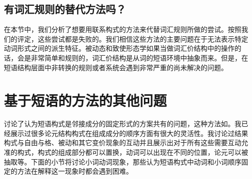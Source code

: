 \begin{exe}
\begin{xlist}[iv.]
\begin{exe}
\begin{xlist}[iv.]
\subsection{有词汇规则的替代方法吗？}
 
在本节中，我们分析了想要用联系构式的方法来代替词汇规则所做的尝试。按照我们的评定，这些尝试都是失败的。我们相信这些方法的主要问题在于无法表示特定动词形式之间的派生特征。被动态和致使形态学如果当做词汇价结构中的操作的话，会是非常简单和规则的，词汇价结构是从词的短语环境中抽象而来。但是，在短语结构层面中非转换的规则或者系统会遇到非常严重的尚未解决的问题。

\section{基于短语的方法的其他问题}

\citet{Mueller2006d}讨论了认为短语构式是邻接成分的固定形式的方案共有的问题，这种方法如\citet{GJ2004a}。我已经展示过很多论元结构构式在组成成分的顺序方面有很大的灵活性。我讨论过结果构式与自由与格、被动和其它变价现象的互动并且展示出对于所有这些需要互动允准的构式，构式的组成部分都可以置换，动词可以出现在不同的位置，论元可以被抽取等。下面的小节将讨论小词动词现象，那些认为短语构式中动词和小词顺序固定的方法在解释这一现象时都会遇到困难。


\end{xlist}
\end{exe}
\end{xlist}
\end{exe}
